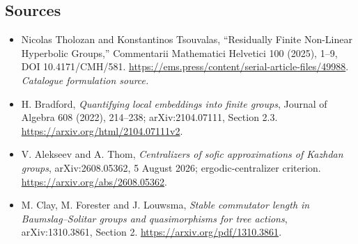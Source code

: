 \documentclass[11pt,a4paper]{article}
\numberwithin{equation}{section}
\begin{document}
\subsection{Sources}
\begin{itemize}\raggedright
\item[\textnormal{[S1]}]\hypertarget{source:statement:1}{} Nicolas Tholozan and Konstantinos Tsouvalas, “Residually Finite Non-Linear Hyperbolic Groups,” Commentarii Mathematici Helvetici 100 (2025), 1–9, DOI 10.4171/CMH/581.
\url{https://ems.press/content/serial-article-files/49988}.
{\small\textit{Catalogue formulation source.}}
\item[\textnormal{[E1]}]\hypertarget{extra:statement:1}{} H. Bradford,
\emph{Quantifying local embeddings into finite groups}, Journal of Algebra
608 (2022), 214--238; arXiv:2104.07111, Section 2.3.
\url{https://arxiv.org/html/2104.07111v2}.
\item[\textnormal{[E2]}]\hypertarget{extra:statement:2}{} V. Alekseev and A. Thom,
\emph{Centralizers of sofic approximations of Kazhdan groups},
arXiv:2608.05362, 5 August 2026; ergodic-centralizer criterion.
\url{https://arxiv.org/abs/2608.05362}.
\item[\textnormal{[E3]}]\hypertarget{extra:statement:3}{} M. Clay, M. Forester
and J. Louwsma, \emph{Stable commutator length in Baumslag--Solitar groups
and quasimorphisms for tree actions}, arXiv:1310.3861, Section 2.
\url{https://arxiv.org/pdf/1310.3861}.

\end{itemize}
\end{document}
